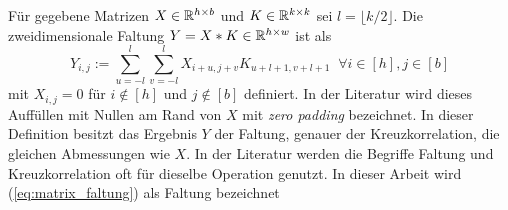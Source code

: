 

\begin{defi} \label{def:matrix_faltung}
    Für gegebene Matrizen $X \in \mathbb{R}^{h \times b}$ und $K \in \mathbb{R}^{k \times k}$ sei $l=\lfloor k/2  \rfloor$.
    Die zweidimensionale Faltung  $Y=X \ast K \in \mathbb{R}^{h \times w}$ ist als 
    \begin{equation}
        \label{eq:matrix_faltung}
        Y_{i,j}:=\sum_{u=-l}^{l} \sum_{v=-l}^{l} X_{i+u,j+v} K_{u+l+1,v+l+1}\; \; \forall i \in [h], j \in [b]
    \end{equation} mit $X_{i,j}=0$ für $i \notin [h]$ und $j \notin [b]$ definiert. In der Literatur wird dieses Auffüllen mit Nullen am Rand von $X$ mit \textit{zero padding} bezeichnet. In dieser Definition besitzt das Ergebnis $Y$ der Faltung, genauer der Kreuzkorrelation, die gleichen Abmessungen wie $X$. In der Literatur werden die Begriffe Faltung und Kreuzkorrelation oft für dieselbe Operation genutzt. In dieser Arbeit wird (\ref{eq:matrix_faltung}) als Faltung bezeichnet 
\end{defi}

